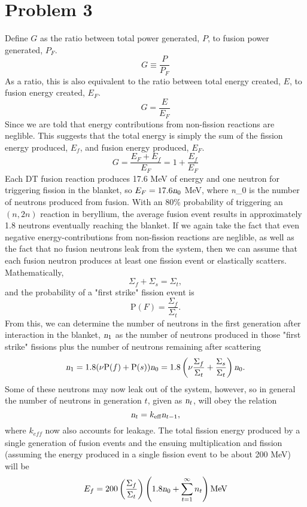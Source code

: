 \documentclass{article}
\newcommand{\Xs}{\Sigma}
\begin{document}

\section*{Problem 3}

Define $G$ as the ratio between total power generated, $P$, to fusion power generated, $P_F$.
$$ G \equiv \frac{P}{P_F} $$
As a ratio, this is also equivalent to the ratio between total energy created, $E$, to fusion energy created, $E_F$.
$$ G  = \frac{E}{E_F} $$
Since we are told that energy contributions from non-fission reactions are neglible. This suggests that the total energy is simply the sum of the fission energy produced, $E_f$, and fusion energy produced, $E_F$. 
$$ G = \frac{E_F + E_f}{E_F} = 1 + \frac{E_f}{E_F}$$
Each DT fusion reaction produces 17.6 MeV of energy and one neutron for triggering fission in the blanket, so $E_F = 17.6\textsl{n}_0$ MeV, where \textsl{n}_0 is the number of neutrons produced from fusion. With an 80\% probability of triggering an $(n,2n)$ reaction in beryllium, the average fusion event results in approximately 1.8 neutrons eventually reaching the blanket. If we again take the fact that even negative energy-contributions from non-fission reactions are neglible, as well as the fact that no fusion neutrons leak from the system, then we can assume that each fusion neutron produces at least one fission event or elastically scatters. Mathematically,
$$ \Xs_f + \Xs_s = \Xs_t ,$$
and the probability of a "first strike" fission event is
$$ \text{P}(F) = \frac{\Xs_f}{\Xs_t}. $$
From this, we can determine the number of neutrons in the first generation after interaction in the blanket, $\textsl{n}_1$ as the number of neutrons produced in those "first strike" fissions plus the number of neutrons remaining after scattering
$$ \textsl{n}_1 = 1.8(\nu \text{P}(f) + \text{P}(s))\textsl{n}_0 = 1.8\left(\nu \frac{\Xs_f}{\Xs_t} + \frac{\Xs_s}{\Xs_t}\right)\textsl{n}_0 .$$
Some of these neutrons may now leak out of the system, however, so in general the number of neutrons in generation $t$, given as $\textsl{n}_t$, will obey the relation
$$ \textsl{n}_t = k_{\text{eff}}\textsl{n}_{t-1} ,$$
where $k_{\textit{eff}}$ now also accounts for leakage.
The total fission energy produced by a single generation of fusion events and the ensuing multiplication and fission (assuming the energy produced in a single fission event to be about 200 MeV) will be
$$ E_f = 200 \left(\frac{\Xs_f}{\Xs_t}\right)\left(1.8\textsl{n}_0 + \sum_{t=1}^{\infty} n_t \right) \text{MeV} $$
\end{document}
